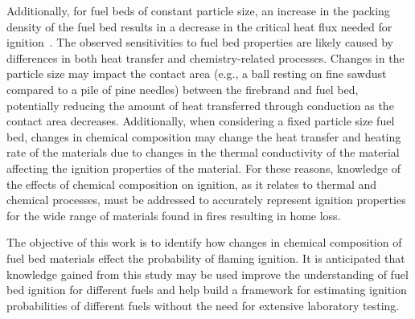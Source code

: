     Additionally, for fuel beds of constant particle size, an increase in the packing density of the fuel bed results in a decrease in the critical heat flux needed for ignition~\cite{Mindykowski2011, Hernandez2017, Rivera2020}. The observed sensitivities to fuel bed properties are likely caused by differences in both heat transfer and chemistry-related processes. Changes in the particle size may impact the contact area (e.g., a ball resting on fine sawdust compared to a pile of pine needles) between the firebrand and fuel bed, potentially reducing the amount of heat transferred through conduction as the contact area decreases. Additionally, when considering a fixed particle size fuel bed, changes in chemical composition may change the heat transfer and heating rate of the materials due to changes in the thermal conductivity of the material affecting the ignition properties of the material. For these reasons, knowledge of the effects of chemical composition on ignition, as it relates to thermal and chemical processes, must be addressed to accurately represent ignition properties for the wide range of materials found in fires resulting in home loss.
  
    The objective of this work is to identify how changes in chemical composition of fuel bed materials effect the probability of flaming ignition. It is anticipated that knowledge gained from this study may be used improve the understanding of fuel bed ignition for different fuels and help build a framework for estimating ignition probabilities of different fuels without the need for extensive laboratory testing.

